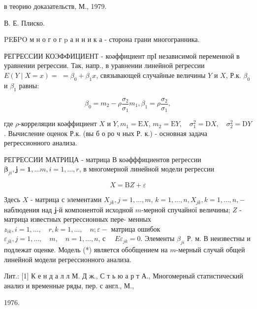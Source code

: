 \documentclass[10pt]{article}
\begin{document}
в теорию доказательств, М., 1979.

В. Е. Плиско.



PEБPO м н о г о г p а н н и к а - сторона грани многогранника.



РЕГРЕССИИ КОЭФФИЦИЕНТ - коәффициент прІ независимой переменной в уравнении регрессии. Так, напр., в уравнении линейной регрессии $E(Y \mid X=x)=$ $=\beta_{0}+\beta_{1} x$, связывающей случайные величины $Y$ и $X$, Р.к. $\beta_{0}$ и $\beta_{1}$ равны:



\[

\beta_{0}=m_{2}-\rho \frac{\sigma_{2}}{\sigma_{1}} m_{1}, \beta_{1}=\rho \frac{\sigma_{2}}{\sigma_{1}},

\]



где $\rho$-корреляции коәффициент $X$ и $Y, m_{1}=\mathrm{E} X$, $m_{2}=\mathrm{E} Y, \quad \sigma_{1}^{2}=\mathrm{D} X, \quad \sigma_{2}^{2}=\mathrm{D} Y$. Вычисление оценок Р.к. (вы б о ро ч ных Р. к.) - основная задача регрессионного анализа.



РЕГРЕССИИ МАТРИЦА - матрица В коәфффициентов регрессии $\boldsymbol{\beta}_{j i}, \boldsymbol{j}=\boldsymbol{1}, \ldots m, i=1, \ldots, r$, в многомерной линейной модели регрессии



\[

X=\mathrm{B} Z+\varepsilon

\]



Здесь $X$ - матрица с элементами $X_{j k}, j=1, \ldots, m$, $k=1, \ldots, n, X_{j k}, k=1, \ldots, n,-$ наблюдения над $\boldsymbol{j}$-й компонентой исходной $m$-мерной спучайної величины; $Z$ - матрица известных регрессионных пере- менных $z_{i k}, i=1, \ldots, \quad r, k=1, \ldots, \quad n ; \varepsilon-$ матрица ошибок $\varepsilon_{j k}, j=1, \ldots, \quad m, \quad n=1, \ldots, n$, с $\quad E \varepsilon_{j k}=0$. Элементы $\beta_{j i}$ Р. м. В неизвестны и подлежат оценке. Модель (*) является обобщением на $m$-мерный случай общей линейной модели регрессионного анализа.



Лит.: [1] К е н д а л л М. Д ж., С т ь ю а р т А., Многомерный статистический анализ и временные ряды, пер. с англ., М.,

1976.
\end{document}
